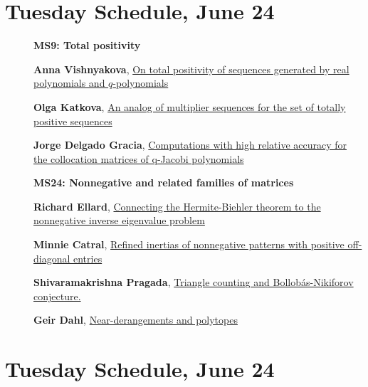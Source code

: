\documentclass[ILAS2025-program.tex]{subfiles}
\begin{document}
\section*{Tuesday Schedule, June 24 }
        
        \begin{description}
    \item[] {\color{mstitle}\textbf{MS9: Total positivity}} 
    \item[] \hypertarget{up0120}{}\textbf{Anna Vishnyakova}, \hyperlink{down0120}{On total positivity of sequences generated by 
real polynomials and $q$-polynomials
}
        \item[] \hypertarget{up0121}{}\textbf{Olga Katkova}, \hyperlink{down0121}{An analog of multiplier sequences for the set of totally positive sequences}
        \item[] \hypertarget{up0122}{}\textbf{Jorge Delgado Gracia}, \hyperlink{down0122}{Computations with high relative accuracy for the collocation matrices of q-Jacobi polynomials}
        \end{description}
    \begin{description}
    \item[] {\color{mstitle}\textbf{MS24: Nonnegative and related families of matrices}} 
    \item[] \hypertarget{up0197}{}\textbf{Richard Ellard}, \hyperlink{down0197}{Connecting the Hermite-Biehler theorem to the nonnegative inverse eigenvalue problem}
        \item[] \hypertarget{up0198}{}\textbf{Minnie Catral}, \hyperlink{down0198}{Refined inertias of nonnegative patterns with positive off-diagonal entries}
        \item[] \hypertarget{up0199}{}\textbf{Shivaramakrishna Pragada}, \hyperlink{down0199}{Triangle counting and Bollob\'{a}s-Nikiforov conjecture.
}
        \item[] \hypertarget{up0200}{}\textbf{Geir Dahl}, \hyperlink{down0200}{Near-derangements and polytopes}
        \end{description}
    \newpage

\section*{Tuesday Schedule, June 24 }
        
\end{document}
